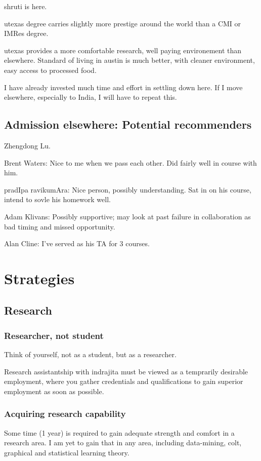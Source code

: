 \documentclass[oneside, article]{memoir}
\begin{document}
shruti is here.

utexas degree carries slightly more prestige around the world than a CMI or IMRes degree.

utexas provides a more comfortable research, well paying environement than elsewhere. Standard of living in austin is much better, with cleaner environment, easy access to processed food.

I have already invested much time and effort in settling down here. If I move elsewhere, especially to India, I will have to repeat this.

\section{Admission elsewhere: Potential recommenders}
Zhengdong Lu.

Brent Waters: Nice to me when we pass each other. Did fairly well in course with him.

pradIpa ravikumAra: Nice person, possibly understanding. Sat in on his course, intend to sovle his homework well.

Adam Klivans: Possibly supportive; may look at past failure in collaboration as bad timing and missed opportunity.

Alan Cline: I've served as his TA for 3 courses.

\chapter{Strategies}
\section{Research}
\subsection{Researcher, not student}
Think of yourself, not as a student, but as a researcher.

Research assistantship with indrajita must be viewed as a temprarily desirable employment, where you gather credentials and qualifications to gain superior employment as soon as possible.

\subsection{Acquiring research capability}
Some time (1 year) is required to gain adequate strength and comfort in a research area. I am yet to gain that in any area, including data-mining, colt, graphical and statistical learning theory.
\end{document}
